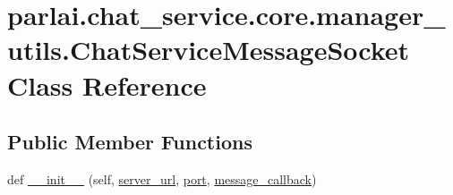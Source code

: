 \hypertarget{classparlai_1_1chat__service_1_1core_1_1manager__utils_1_1ChatServiceMessageSocket}{}\section{parlai.\+chat\+\_\+service.\+core.\+manager\+\_\+utils.\+Chat\+Service\+Message\+Socket Class Reference}
\label{classparlai_1_1chat__service_1_1core_1_1manager__utils_1_1ChatServiceMessageSocket}
\subsection*{Public Member Functions}
\begin{DoxyCompactItemize}
\item 
def \hyperlink{classparlai_1_1chat__service_1_1core_1_1manager__utils_1_1ChatServiceMessageSocket_ae21cee0e3e221d9c8480abdd3dd56eee}{\+\_\+\+\_\+init\+\_\+\+\_\+} (self, \hyperlink{classparlai_1_1chat__service_1_1core_1_1manager__utils_1_1ChatServiceMessageSocket_a42860d1afbafa3cb98688feae503bcef}{server\+\_\+url}, \hyperlink{classparlai_1_1chat__service_1_1core_1_1manager__utils_1_1ChatServiceMessageSocket_a0dfdf8ef9c7388e55d7c174ee01fc572}{port}, \hyperlink{classparlai_1_1chat__service_1_1core_1_1manager__utils_1_1ChatServiceMessageSocket_a8a28e261f70852625b02a1ec5c18356a}{message\+\_\+callback})
\end{DoxyCompactItemize}
